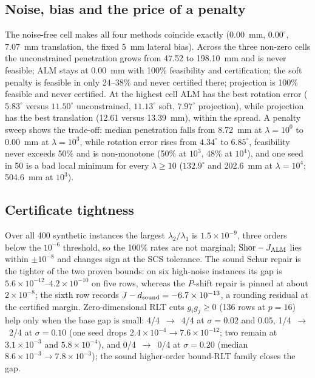 \subsection{Noise, bias and the price of a penalty}\label{sec:noise}
The noise-free cell makes all four methods coincide exactly (0.00~mm, $0.00^\circ$, 7.07~mm translation, the fixed 5~mm lateral bias). Across the three non-zero cells the unconstrained penetration grows from 47.52 to 198.10~mm and is never feasible; ALM stays at 0.00~mm with 100\% feasibility and certification; the soft penalty is feasible in only 24--38\% and never certified there; projection is 100\% feasible and never certified. At the highest cell ALM has the best rotation error ($5.83^\circ$ versus $11.50^\circ$ unconstrained, $11.13^\circ$ soft, $7.97^\circ$ projection), while projection has the best translation (12.61 versus 13.39~mm), within the spread. A penalty sweep shows the trade-off: median penetration falls from 8.72~mm at $\lambda=10^0$ to 0.00~mm at $\lambda=10^3$, while rotation error rises from $4.34^\circ$ to $6.85^\circ$, feasibility never exceeds 50\% and is non-monotone (50\% at $10^3$, 48\% at $10^4$), and one seed in 50 is a bad local minimum for every $\lambda\ge10$ ($132.9^\circ$ and 202.6~mm at $\lambda=10^4$; 504.6~mm at $10^3$).

\subsection{Certificate tightness}\label{sec:tight}
Over all 400 synthetic instances the largest $\lambda_2/\lambda_1$ is $1.5\times10^{-9}$, three orders below the $10^{-6}$ threshold, so the 100\% rates are not marginal; $\mathrm{Shor}-J_{\rm ALM}$ lies within $\pm10^{-8}$ and changes sign at the SCS tolerance. The sound Schur repair is the tighter of the two proven bounds: on six high-noise instances its gap is $5.6\times10^{-12}$--$4.2\times10^{-10}$ on five rows, whereas the $P$-shift repair is pinned at about $2\times10^{-8}$; the sixth row records $J-d_{\rm sound}=-6.7\times10^{-13}$, a rounding residual at the certified margin. Zero-dimensional RLT cuts $g_ig_j\ge0$ (136 rows at $p=16$) help only when the base gap is small: 4/4~$\to$~4/4 at $\sigma=0.02$ and $0.05$, 1/4~$\to$~2/4 at $\sigma=0.10$ (one seed drops $2.4\times10^{-4}\to7.6\times10^{-12}$; two remain at $3.1\times10^{-3}$ and $5.8\times10^{-4}$), and 0/4~$\to$~0/4 at $\sigma=0.20$ (median $8.6\times10^{-3}\to7.8\times10^{-3}$); the sound higher-order bound-RLT family closes the gap.

